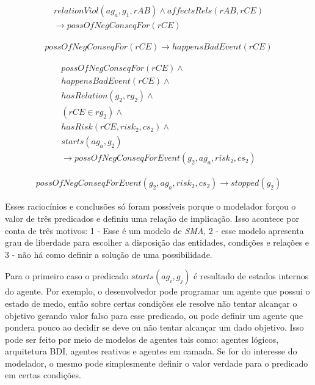 \begin{eqnarray}
    relationViol(ag_a,g_1,rAB)  \wedge affectsRels(rAB,rCE) \nonumber \\
    \to possOfNegConseqFor(rCE)  
\end{eqnarray}

\begin{eqnarray}
    possOfNegConseqFor(rCE) \to happensBadEvent(rCE) 
\end{eqnarray}

\begin{eqnarray}\label{paybutiamnotguilty}
    possOfNegConseqFor(rCE) \wedge  \nonumber \\
    happensBadEvent(rCE) \wedge  \nonumber \\
    hasRelation(g_2,rg_2) \wedge  \nonumber \\
    (rCE \in rg_2) \nonumber \wedge  \nonumber \\
    hasRisk(rCE,risk_2,cs_2) \wedge  \nonumber \\
    starts(ag_a,g_2) \nonumber  \nonumber \\
    \to possOfNegConseqForEvent(g_2,ag_a,risk_2,cs_2) 
\end{eqnarray}


\begin{eqnarray}\label{badcons}
    possOfNegConseqForEvent(g_2,ag_a,risk_2,cs_2) \to stopped(g_2) 
\end{eqnarray}


Esses raciocínios e conclusões só foram possíveis porque o modelador forçou o valor de três predicados e definiu uma relação de implicação. Isso acontece por conta de três motivos: 1 - Esse é um modelo de \textit{SMA}, 2 - esse modelo apresenta grau de liberdade para escolher a disposição das entidades, condições e relações e 3 - não há como definir a solução de uma possibilidade. 

Para o primeiro caso o predicado $starts(ag_i,g_j)$ é resultado de estados internos do agente. Por exemplo, o desenvolvedor pode programar um agente que possui o estado de medo, então sobre certas condições ele resolve não tentar alcançar o objetivo gerando valor falso para esse predicado, ou pode definir um agente que pondera pouco ao decidir se deve ou não tentar alcançar um dado objetivo. Isso pode ser feito por meio de modelos de agentes tais como: agentes lógicos, arquitetura BDI, agentes reativos e agentes em camada. Se for do interesse do modelador, o mesmo pode simplesmente definir o valor verdade para o predicado em certas condições. 

